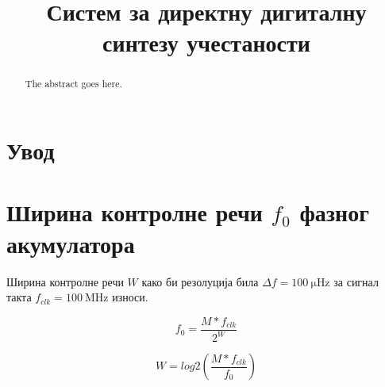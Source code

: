 \documentclass[conference]{IEEEJERM}
\begin{document}
%
\title{Систем за директну дигиталну синтезу учестаности}


\author{
}

\hyphenation{}

\maketitle

\begin{abstract}
The abstract goes here.
\end{abstract}

\IEEEpeerreviewmaketitle



\section{Увод}

 


\section{Ширина контролне речи $f_0$ фазног акумулатора}

Ширина контролне речи $W$ како би резолуција била $ \Delta f = \SI{100}{\micro\hertz}$ за сигнал такта $f_{clk} = \SI{100}{\mega\hertz}$ износи.

\begin{equation}
f_0 = \dfrac{M * f_{clk}}{2^W}
\end{equation}

\begin{equation}
W = log2\left(\dfrac{ M*f_{clk} }{ f_0}\right)
\end{equation}
\end{document}

